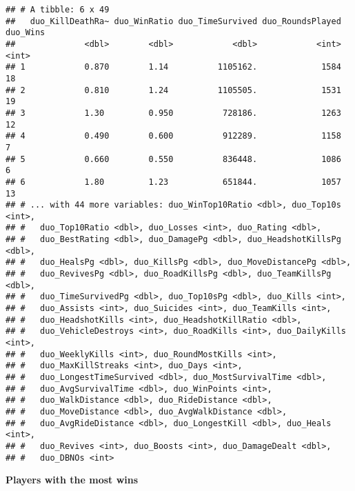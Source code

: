 \documentclass[]{article}
\begin{document}
\begin{verbatim}
## # A tibble: 6 x 49
##   duo_KillDeathRa~ duo_WinRatio duo_TimeSurvived duo_RoundsPlayed duo_Wins
##              <dbl>        <dbl>            <dbl>            <int>    <int>
## 1            0.870        1.14          1105162.             1584       18
## 2            0.810        1.24          1105505.             1531       19
## 3            1.30         0.950          728186.             1263       12
## 4            0.490        0.600          912289.             1158        7
## 5            0.660        0.550          836448.             1086        6
## 6            1.80         1.23           651844.             1057       13
## # ... with 44 more variables: duo_WinTop10Ratio <dbl>, duo_Top10s <int>,
## #   duo_Top10Ratio <dbl>, duo_Losses <int>, duo_Rating <dbl>,
## #   duo_BestRating <dbl>, duo_DamagePg <dbl>, duo_HeadshotKillsPg <dbl>,
## #   duo_HealsPg <dbl>, duo_KillsPg <dbl>, duo_MoveDistancePg <dbl>,
## #   duo_RevivesPg <dbl>, duo_RoadKillsPg <dbl>, duo_TeamKillsPg <dbl>,
## #   duo_TimeSurvivedPg <dbl>, duo_Top10sPg <dbl>, duo_Kills <int>,
## #   duo_Assists <int>, duo_Suicides <int>, duo_TeamKills <int>,
## #   duo_HeadshotKills <int>, duo_HeadshotKillRatio <dbl>,
## #   duo_VehicleDestroys <int>, duo_RoadKills <int>, duo_DailyKills <int>,
## #   duo_WeeklyKills <int>, duo_RoundMostKills <int>,
## #   duo_MaxKillStreaks <int>, duo_Days <int>,
## #   duo_LongestTimeSurvived <dbl>, duo_MostSurvivalTime <dbl>,
## #   duo_AvgSurvivalTime <dbl>, duo_WinPoints <int>,
## #   duo_WalkDistance <dbl>, duo_RideDistance <dbl>,
## #   duo_MoveDistance <dbl>, duo_AvgWalkDistance <dbl>,
## #   duo_AvgRideDistance <dbl>, duo_LongestKill <dbl>, duo_Heals <int>,
## #   duo_Revives <int>, duo_Boosts <int>, duo_DamageDealt <dbl>,
## #   duo_DBNOs <int>
\end{verbatim}

\textbf{Players with the most wins}
\end{document}
